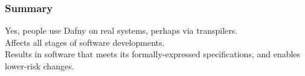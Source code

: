 \documentclass{beamer}
\newenvironment{changemargin}[1]{%
  \begin{list}{}{%
    \setlength{\topsep}{0pt}%
    \setlength{\leftmargin}{#1}%
    \setlength{\rightmargin}{1em}
    \setlength{\listparindent}{\parindent}%
    \setlength{\itemindent}{\parindent}%
    \setlength{\parsep}{\parskip}%
  }%
  \item[]}{\end{list}}
\begin{document}
\begin{frame}
  \frametitle{Summary}
  \Large
  \begin{changemargin}{1cm}
    Yes, people use Dafny on real systems, perhaps via transpilers.\\[2em]
    Affects all stages of software developments.\\
    Results in software that meets its formally-expressed specifications, and enables lower-risk changes.
  \end{changemargin}
\end{frame}
\end{document}
